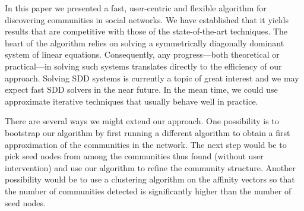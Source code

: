 In this paper we presented a fast, user-centric and flexible 
algorithm for discovering communities in social networks. 
We have established that it yields results that are competitive 
with those of the state-of-the-art techniques. The heart of the 
algorithm relies on solving a symmetrically diagonally dominant 
system of linear equations. Consequently, any progress---both theoretical 
or practical---in solving such systems translates directly 
to the efficiency of our approach. Solving SDD systems is currently a topic
of great interest and we may expect fast SDD solvers in the near future. 
In the mean time, we could use approximate iterative techniques that usually 
behave well in practice.

There are several ways we might extend our approach. One possibility is to 
bootstrap our algorithm by first running a different algorithm to obtain 
a first approximation of the communities in the network. The next step 
would be to pick seed nodes from among the communities thus found 
(without user intervention) and use our algorithm to refine 
the community structure. Another possibility would be to use a 
clustering algorithm on the affinity vectors so that the number of 
communities detected is significantly higher than the number of 
seed nodes. 







